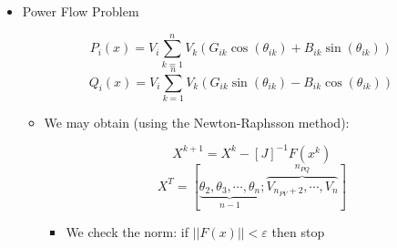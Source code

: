 \begin{itemize}
  \item Power Flow Problem

    $$P_i(x)=V_i\sum_{k=1}^{n}V_{k}\left( G_{ik}\cos(\theta_{ik})+B_{ik}\sin(\theta_{ik}) \right)$$
    $$Q_i(x)=V_i\sum_{k=1}^{n}V_{k}\left( G_{ik}\sin(\theta_{ik})-B_{ik}\cos(\theta_{ik}) \right)$$

    \begin{itemize}

      \item We may obtain (using the Newton-Raphsson method):

        $$X^{k+1}=X^k-[J]^{-1}F(x^k)$$
        $$X^T=[\underbrace{\theta_2,\theta_3,\cdots,\theta_n}_{n-1};\overbrace{V_{n_{PV}+2},\cdots,V_{n}}^{n_{PQ}}]$$

        \begin{itemize}

          \item We check the norm: if $||F(x)||<\varepsilon$ then stop

        \end{itemize}

    \end{itemize}

\end{itemize}



